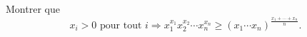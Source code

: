 Montrer que
\[ x_i > 0 \text{ pour tout } i \Rightarrow x_1^{x_1}x_2^{x_2} \cdots x_n^{x_n} \geq (x_1 \cdots x_n)^{\frac{x_1 + \cdots + x_n}{n}}. \]
